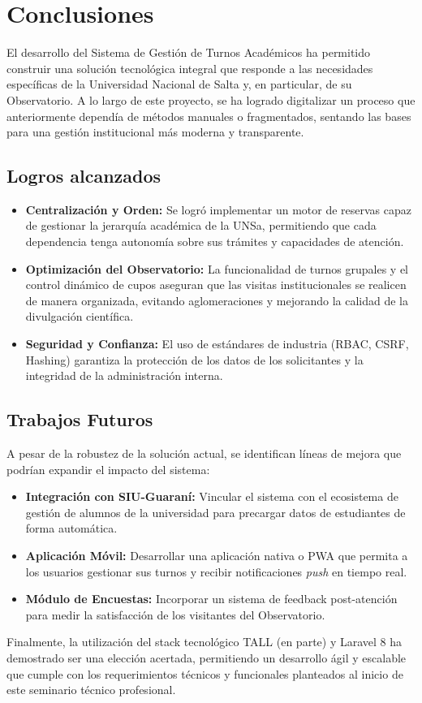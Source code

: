 \chapter{Conclusiones}
El desarrollo del Sistema de Gestión de Turnos Académicos ha permitido construir una solución tecnológica integral que responde a las necesidades específicas de la Universidad Nacional de Salta y, en particular, de su Observatorio. A lo largo de este proyecto, se ha logrado digitalizar un proceso que anteriormente dependía de métodos manuales o fragmentados, sentando las bases para una gestión institucional más moderna y transparente.

\section{Logros alcanzados}
\begin{itemize}
    \item \textbf{Centralización y Orden:} Se logró implementar un motor de reservas capaz de gestionar la jerarquía académica de la UNSa, permitiendo que cada dependencia tenga autonomía sobre sus trámites y capacidades de atención.
    \item \textbf{Optimización del Observatorio:} La funcionalidad de turnos grupales y el control dinámico de cupos aseguran que las visitas institucionales se realicen de manera organizada, evitando aglomeraciones y mejorando la calidad de la divulgación científica.
    \item \textbf{Seguridad y Confianza:} El uso de estándares de industria (RBAC, CSRF, Hashing) garantiza la protección de los datos de los solicitantes y la integridad de la administración interna.
\end{itemize}

\section{Trabajos Futuros}
A pesar de la robustez de la solución actual, se identifican líneas de mejora que podrían expandir el impacto del sistema:
\begin{itemize}
    \item \textbf{Integración con SIU-Guaraní:} Vincular el sistema con el ecosistema de gestión de alumnos de la universidad para precargar datos de estudiantes de forma automática.
    \item \textbf{Aplicación Móvil:} Desarrollar una aplicación nativa o PWA que permita a los usuarios gestionar sus turnos y recibir notificaciones \textit{push} en tiempo real.
    \item \textbf{Módulo de Encuestas:} Incorporar un sistema de feedback post-atención para medir la satisfacción de los visitantes del Observatorio.
\end{itemize}

Finalmente, la utilización del stack tecnológico TALL (en parte) y Laravel 8 ha demostrado ser una elección acertada, permitiendo un desarrollo ágil y escalable que cumple con los requerimientos técnicos y funcionales planteados al inicio de este seminario técnico profesional.
